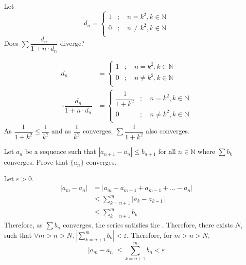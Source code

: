 \documentclass[fleqn, a4paper, 12pt, twoside]{article}
\theoremstyle{definition}
\theoremstyle{theorem}
\begin{document}
\begin{question}
	Let
	\begin{equation*}
		d_n = 
			\begin{cases}
				1 &;\quad n = k^2, k \in \mathbb{N}\\
				0 &;\quad n \neq k^2, k \in \mathbb{N}\\
			\end{cases}
	\end{equation*}
	Does $\sum \dfrac{d_n}{1 + n \cdot d_n}$ diverge?
\end{question}

\begin{solution}
	\begin{align*}
		d_n &= 
			\begin{cases}
				1 &;\quad n = k^2, k \in \mathbb{N}\\
				0 &;\quad n \neq k^2, k \in \mathbb{N}\\
			\end{cases}\\
		\therefore \dfrac{d_n}{1 + n \cdot d_n} &=
			\begin{cases}
				\dfrac{1}{1 + k^2} &;\quad n = k^2, k \in \mathbb{N}\\
				0 &;\quad n \neq k^2, k \in \mathbb{N}\\
			\end{cases}
	\end{align*}
	As $\dfrac{1}{1 + k^2} \le \dfrac{1}{k^2}$ and as $\dfrac{1}{k^2}$ converges, $\sum \dfrac{1}{1 + k^2}$ also converges.
\end{solution}

\begin{question}
	Let $a_n$ be a sequence such that $|a_{n + 1} - a_n| \le b_{n + 1}$ for all $n \in \mathbb{N}$ where $\sum b_k$ converges.
	Prove that $\{a_n\}$ converges.
\end{question}

\begin{solution}
	Let $\varepsilon > 0$.
	\begin{align*}
		|a_m - a_n| &= |a_m - a_{m - 1} + a_{m - 1} + \dots - a_n|\\
		&\le \sum_{k = n + 1}^{m} |a_k - a_{k - 1}|\\
		&\le \sum_{k = n + 1}^{m} b_k
	\end{align*}
	Therefore, as $\sum b_n$ converges, the series satisfies the .
	Therefore, there exists $N$, such that $\forall m > n > N, \left| \sum\limits_{k = n + 1}^{m} b_k \right| < \varepsilon$.
	Therefore, for $m > n > N$,
	\begin{equation*}
		|a_m - a_n| \le \sum_{k = n + 1}^{m} b_n < \varepsilon
	\end{equation*}
\end{solution}
\end{document}
